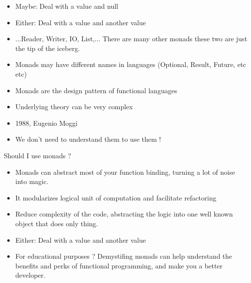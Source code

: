 \begin{frame}
    \begin{itemize}
        \item Maybe: Deal with a value and null
        \item Either: Deal with a value and another value
        \item ...Reader, Writer, IO, List,... There are many other monads these
            two are just the tip of the iceberg.
        \item Monads may have different names in languages (Optional, Result, Future, etc etc)
        \item Monads are the design pattern of functional languages
        \item Underlying theory can be very complex
        \item 1988, Eugenio Moggi
        \item We don't need to understand them to use them !
    \end{itemize}
\end{frame}

\begin{frame}
    \centering
    \Huge Should I use monads ?
\end{frame}

\begin{frame}
    \begin{itemize}
        \item Monads can abstract most of your function binding, turning a lot of
            noise into magic.
        \item It modularizes logical unit of computation and facilitate refactoring
        \item Reduce complexity of the code, abstracting the logic into one well
            known object that does only thing.
        \item Either: Deal with a value and another value
        \item For educational purposes ? Demystifing monads can help understand
            the benefits and perks of functional programming, and make you a better
            developer.
    \end{itemize}
\end{frame}
